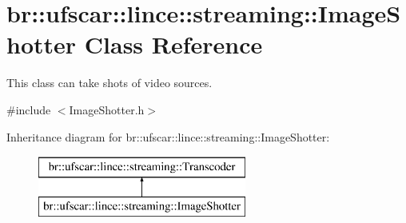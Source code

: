\hypertarget{classbr_1_1ufscar_1_1lince_1_1streaming_1_1ImageShotter}{
\section{br::ufscar::lince::streaming::ImageShotter Class Reference}
\label{classbr_1_1ufscar_1_1lince_1_1streaming_1_1ImageShotter}
}


This class can take shots of video sources.  




{\ttfamily \#include $<$ImageShotter.h$>$}

Inheritance diagram for br::ufscar::lince::streaming::ImageShotter:\begin{figure}[H]
\begin{center}
\leavevmode
\includegraphics[height=2cm]{classbr_1_1ufscar_1_1lince_1_1streaming_1_1ImageShotter}
\end{center}
\end{figure}
